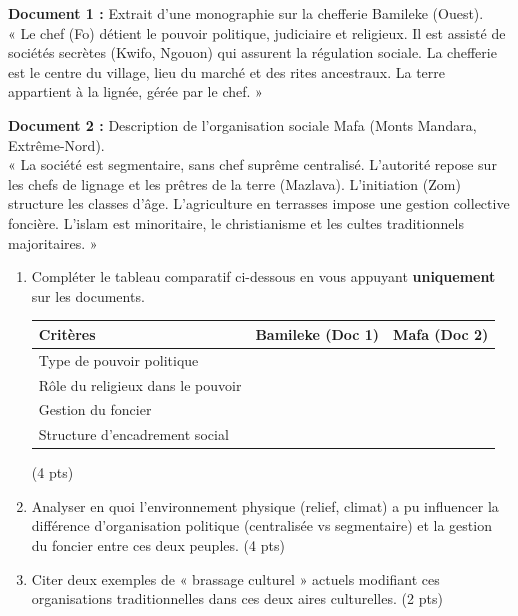 \documentclass[11pt]{article}
\begin{document}
\begin{exercice}
\label{exo:orga}
\textbf{Document 1 :} Extrait d'une monographie sur la chefferie Bamileke (Ouest).\\
« Le chef (Fo) détient le pouvoir politique, judiciaire et religieux. Il est assisté de sociétés secrètes (Kwifo, Ngouon) qui assurent la régulation sociale. La chefferie est le centre du village, lieu du marché et des rites ancestraux. La terre appartient à la lignée, gérée par le chef. »

\textbf{Document 2 :} Description de l'organisation sociale Mafa (Monts Mandara, Extrême-Nord).\\
« La société est segmentaire, sans chef suprême centralisé. L'autorité repose sur les chefs de lignage et les prêtres de la terre (Mazlava). L'initiation (Zom) structure les classes d'âge. L'agriculture en terrasses impose une gestion collective foncière. L'islam est minoritaire, le christianisme et les cultes traditionnels majoritaires. »

\begin{enumerate}
    \item Compléter le tableau comparatif ci-dessous en vous appuyant \textbf{uniquement} sur les documents.
    \begin{center}
    \begin{tabular}{|l|c|c|}
    \hline
    \textbf{Critères} & \textbf{Bamileke (Doc 1)} & \textbf{Mafa (Doc 2)} \\
    \hline
    Type de pouvoir politique & & \\
    Rôle du religieux dans le pouvoir & & \\
    Gestion du foncier & & \\
    Structure d'encadrement social & & \\
    \hline
    \end{tabular}
    \end{center}
    \hfill (4 pts)
    \item Analyser en quoi l'environnement physique (relief, climat) a pu influencer la différence d'organisation politique (centralisée vs segmentaire) et la gestion du foncier entre ces deux peuples. \hfill (4 pts)
    \item Citer deux exemples de « brassage culturel » actuels modifiant ces organisations traditionnelles dans ces deux aires culturelles. \hfill (2 pts)
\end{enumerate}
\end{exercice}
\end{document}
